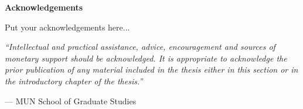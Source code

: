 \begin{center}
\textbf{\large Acknowledgements}
\end{center}

Put your acknowledgements here...

\vspace{1cm}

\emph{``Intellectual and practical assistance, advice, encouragement and
sources of monetary support should be acknowledged. It is appropriate to
acknowledge the prior publication of any material included in the thesis
either in this section or in the introductory chapter of the thesis.''}

\hfill --- MUN School of Graduate Studies
